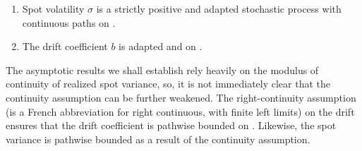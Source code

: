 \begin{ass}\label{as:vol}\mbox{} 
  \begin{enumerate}
    \item Spot volatility $\sigma$ is a strictly positive and adapted stochastic process  with continuous paths on \domain.  
    \item The drift coefficient $b$ is adapted and \cadlag on \domain. 
  \end{enumerate}
\end{ass}
\noindent The asymptotic results we shall establish  rely heavily on the modulus of continuity of realized spot variance, so, it is not immediately clear that the continuity assumption can be further weakened.     
The right-continuity assumption (\cadlag is a French abbreviation for right continuous, with finite left limits)  on the drift ensures that the drift coefficient is pathwise bounded on \domain. Likewise, the spot variance is pathwise bounded as a result of the continuity assumption.   
